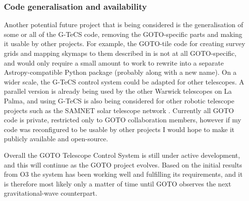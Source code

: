 \begin{colsection}
\subsubsection{Code generalisation and availability}

Another potential future project that is being considered is the generalisation of some or all of the G-TeCS code, removing the GOTO-specific parts and making it usable by other projects. For example, the GOTO-tile code for creating survey grids and mapping skymaps to them described in  is not at all GOTO-specific, and would only require a small amount to work to rewrite into a separate Astropy-compatible Python package (probably along with a new name). On a wider scale, the G-TeCS control system could be adapted for other telescopes. A parallel version is already being used by the other Warwick telescopes on La Palma, and using G-TeCS is also being considered for other robotic telescope projects such as the SAMNET solar telescope network \citep{SAMNET}. Currently all GOTO code is private, restricted only to GOTO collaboration members, however if my code was reconfigured to be usable by other projects I would hope to make it publicly available and open-source.

\bigskip

Overall the GOTO Telescope Control System is still under active development, and this will continue as the GOTO project evolves. Based on the initial results from O3 the system has been working well and fulfilling its requirements, and it is therefore most likely only a matter of time until GOTO observes the next gravitational-wave counterpart.

\end{colsection}

